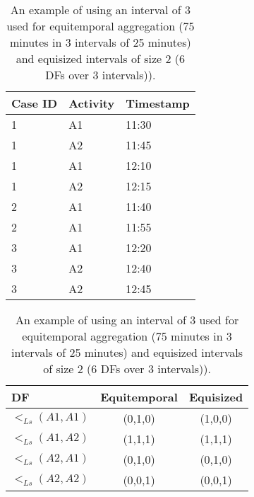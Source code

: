 \begin{table}[htbp]
   \begin{minipage}{.5\textwidth}
   	\centering
    \begin{tabular}{|l|l|l|}
    \toprule
    {Case ID} & Activity &Timestamp \\
    \midrule
    1     & A1    & 11:30 \\
    1     & A2    & 11:45 \\
    1     & A1    & 12:10 \\
    1     & A2    & 12:15 \\
    \midrule
    2     & A1    & 11:40 \\
    2     & A1    & 11:55 \\
    \midrule
    3     & A1    & 12:20 \\
    3     & A2    & 12:40 \\
    3     & A2    & 12:45 \\
    \bottomrule
    \end{tabular}
    \caption{Example event log with 3 traces and 2 activities.}
\label{tab:eventlog}%
\end{minipage}
  \begin{minipage}{.5\textwidth}
  	\centering
    \begin{tabular}{|l|c|c|}
    \toprule
    DF    & Equitemporal  & Equisized \\
    \midrule
    $<_{Ls}(A1,A1)$ & (0,1,0) & (1,0,0) \\
    $<_{Ls}(A1,A2)$ & (1,1,1) & (1,1,1) \\
    $<_{Ls}(A2,A1)$ & (0,1,0) & (0,1,0) \\
    $<_{Ls}(A2,A2)$ & (0,0,1) & (0,0,1) \\
    \bottomrule
    \end{tabular}
  \caption{An example of using an interval of 3 used for equitemporal aggregation (75 minutes in 3 intervals of 25 minutes) and equisized intervals of size 2 (6 DFs over 3 intervals)).}
  \label{tab:aggregation}
 \end{minipage}%
\end{table}%
